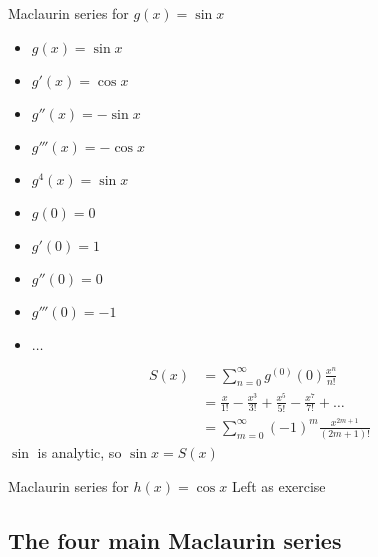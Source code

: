 \eg Maclaurin series for \(g(x) = \sin x\)
\begin{multicols}{2}
    \begin{itemize}
        \item \(g(x) = \sin x\)
        \item \(g'(x) = \cos x\)
        \item \(g''(x) = -\sin x\)
        \item \(g'''(x) = -\cos x\)
        \item \(g^4(x) = \sin x\)
    \end{itemize}
    \begin{itemize}
        \item \(g(0) = 0\)
        \item \(g'(0) = 1\)
        \item \(g''(0) = 0\)
        \item \(g'''(0) = -1\)
        \item \(\dots\)
    \end{itemize}
\end{multicols}
\begin{align*}
    S(x) & = \sum_{n = 0}^{\infty} g^{(0)}(0)\frac{x^n}{n!}                          \\
         & = \frac{x}{1!} - \frac{x^3}{3!} + \frac{x^5}{5!} - \frac{x^7}{7!} + \dots \\
         & = \sum_{m = 0}^{\infty} (-1)^m \frac{x^{2m+1}}{(2m+1)!}
\end{align*}
\(\sin\) is analytic, so \(\sin x = S(x)\)


\eg Maclaurin series for \(h(x) = \cos x\)
Left as exercise

\subsection*{The four main Maclaurin series}


